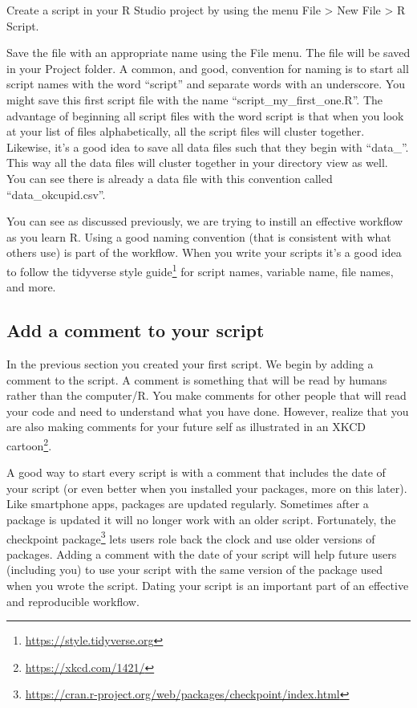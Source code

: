 \documentclass[
]{krantz}
\renewcommand{\href}[2]{#2\footnote{\url{#1}}}
\begin{document}
Create a script in your R Studio project by using the menu File \textgreater{} New File \textgreater{} R Script.

Save the file with an appropriate name using the File menu. The file will be saved in your Project folder. A common, and good, convention for naming is to start all script names with the word ``script'' and separate words with an underscore. You might save this first script file with the name ``script\_my\_first\_one.R''. The advantage of beginning all script files with the word script is that when you look at your list of files alphabetically, all the script files will cluster together. Likewise, it's a good idea to save all data files such that they begin with ``data\_''. This way all the data files will cluster together in your directory view as well. You can see there is already a data file with this convention called ``data\_okcupid.csv''.

You can see as discussed previously, we are trying to instill an effective workflow as you learn R. Using a good naming convention (that is consistent with what others use) is part of the workflow. When you write your scripts it's a good idea to follow the \href{https://style.tidyverse.org}{tidyverse style guide} for script names, variable name, file names, and more.

\hypertarget{add-a-comment-to-your-script}{%
\subsection{Add a comment to your script}\label{add-a-comment-to-your-script}}

In the previous section you created your first script. We begin by adding a comment to the script. A comment is something that will be read by humans rather than the computer/R. You make comments for other people that will read your code and need to understand what you have done. However, realize that you are also making comments for your future self as illustrated in an \href{https://xkcd.com/1421/}{XKCD cartoon}.

A good way to start every script is with a comment that includes the date of your script (or even better when you installed your packages, more on this later). Like smartphone apps, packages are updated regularly. Sometimes after a package is updated it will no longer work with an older script. Fortunately, the \href{https://cran.r-project.org/web/packages/checkpoint/index.html}{checkpoint package} lets users role back the clock and use older versions of packages. Adding a comment with the date of your script will help future users (including you) to use your script with the same version of the package used when you wrote the script. Dating your script is an important part of an effective and reproducible workflow.
\end{document}
